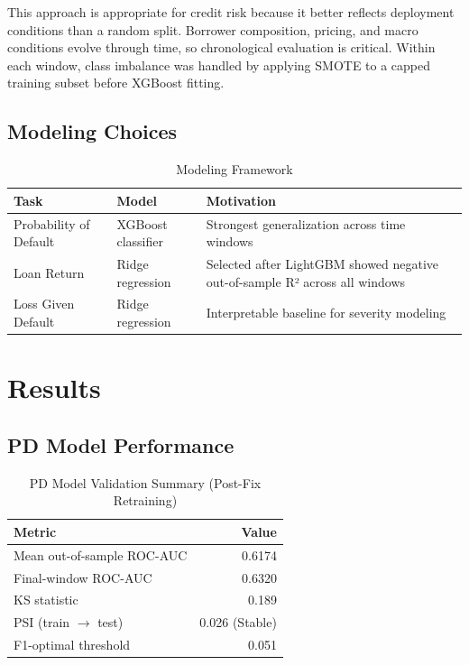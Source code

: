 \documentclass[12pt]{article}
\begin{document}
This approach is appropriate for credit risk because it better reflects deployment conditions than a random split. Borrower composition, pricing, and macro conditions evolve through time, so chronological evaluation is critical. Within each window, class imbalance was handled by applying SMOTE to a capped training subset before XGBoost fitting.

\subsection{Modeling Choices}

\begin{table}[H]
\centering
\caption{Modeling Framework}
\begin{tabularx}{\textwidth}{>{\raggedright\arraybackslash}p{} >{\raggedright\arraybackslash}p{} X}
\toprule
Task & Model & Motivation \\
\midrule
Probability of Default & XGBoost classifier & Strongest generalization across time windows \\
Loan Return & Ridge regression & Selected after LightGBM showed negative out-of-sample R² across all windows \\
Loss Given Default & Ridge regression & Interpretable baseline for severity modeling \\
\bottomrule
\end{tabularx}
\end{table}

\section{Results}

\subsection{PD Model Performance}

\begin{table}[H]
\centering
\caption{PD Model Validation Summary (Post-Fix Retraining)}
\begin{tabular}{lr}
\toprule
Metric & Value \\
\midrule
Mean out-of-sample ROC-AUC & 0.6174 \\
Final-window ROC-AUC & 0.6320 \\
KS statistic & 0.189 \\
PSI (train $\rightarrow$ test) & 0.026 (Stable) \\
F1-optimal threshold & 0.051 \\
\bottomrule
\end{tabular}
\end{table}
\end{document}
